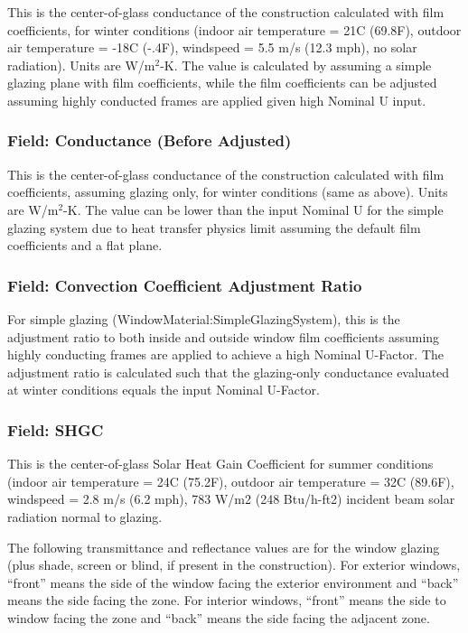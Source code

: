 This is the center-of-glass conductance of the construction calculated with film coefficients, for winter conditions (indoor air temperature = 21C (69.8F), outdoor air temperature = -18C (-.4F), windspeed = 5.5 m/s (12.3 mph), no solar radiation). Units are W/m\(^{2}\)-K. The value is calculated by assuming a simple glazing plane with film coefficients, while the film coefficients can be adjusted assuming highly conducted frames are applied given high Nominal U input.

\subsubsection{Field: Conductance (Before Adjusted)}\label{field-conductance-before-adjusted}

This is the center-of-glass conductance of the construction calculated with film coefficients, assuming glazing only, for winter conditions (same as above). Units are W/m\(^{2}\)-K. The value can be lower than the input Nominal U for the simple glazing system due to heat transfer physics limit assuming the default film coefficients and a flat plane.

\subsubsection{Field: Convection Coefficient Adjustment Ratio}\label{field-convection-coefficient-adjustment-ratio}

For simple glazing (WindowMaterial:SimpleGlazingSystem), this is the adjustment ratio to both inside and outside window film coefficients assuming highly conducting frames are applied to achieve a high Nominal U-Factor. The adjustment ratio is calculated such that the glazing-only conductance evaluated at winter conditions equals the input Nominal U-Factor.

\subsubsection{Field: SHGC}\label{field-shgc}

This is the center-of-glass Solar Heat Gain Coefficient for summer conditions (indoor air temperature = 24C (75.2F), outdoor air temperature = 32C (89.6F), windspeed = 2.8 m/s (6.2 mph), 783 W/m2 (248 Btu/h-ft2) incident beam solar radiation normal to glazing.

The following transmittance and reflectance values are for the window glazing (plus shade, screen or blind, if present in the construction). For exterior windows, ``front'' means the side of the window facing the exterior environment and ``back'' means the side facing the zone. For interior windows, ``front'' means the side to window facing the zone and ``back'' means the side facing the adjacent zone.

